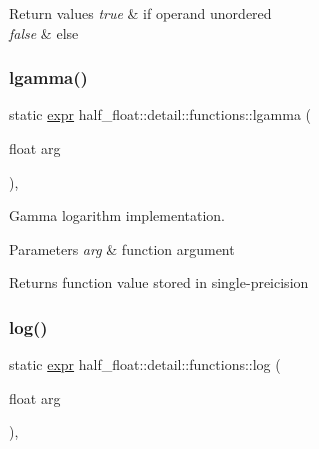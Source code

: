 \begin{DoxyRetVals}{Return values}
{\em true} & if operand unordered \\
\hline
{\em false} & else \\
\hline
\end{DoxyRetVals}
\mbox{\label{structhalf__float_1_1detail_1_1functions_a84d46a2a632e0c48ceaca75c9afa6654}} 
\subsubsection{\texorpdfstring{lgamma()}{lgamma()}}
{\footnotesize\ttfamily static \hyperlink{structhalf__float_1_1detail_1_1expr}{expr} half\+\_\+float\+::detail\+::functions\+::lgamma (\begin{DoxyParamCaption}\item[{float}]{arg }\end{DoxyParamCaption})\hspace{0.3cm}{\ttfamily [inline]}, {\ttfamily [static]}}

Gamma logarithm implementation. 
\begin{DoxyParams}{Parameters}
{\em arg} & function argument \\
\hline
\end{DoxyParams}
\begin{DoxyReturn}{Returns}
function value stored in single-\/preicision 
\end{DoxyReturn}
\mbox{\label{structhalf__float_1_1detail_1_1functions_a587c13df1bce45e25cac92e44fe58602}} 
\subsubsection{\texorpdfstring{log()}{log()}}
{\footnotesize\ttfamily static \hyperlink{structhalf__float_1_1detail_1_1expr}{expr} half\+\_\+float\+::detail\+::functions\+::log (\begin{DoxyParamCaption}\item[{float}]{arg }\end{DoxyParamCaption})\hspace{0.3cm}{\ttfamily [inline]}, {\ttfamily [static]}}

